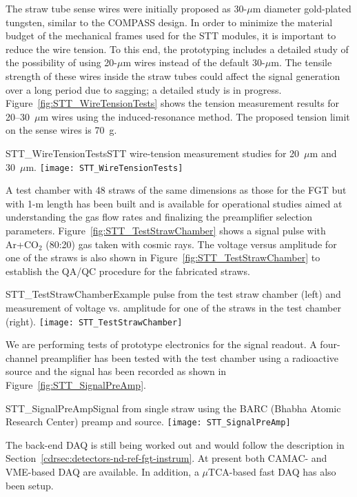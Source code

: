 The straw tube sense wires were initially proposed as 30-$\mu$m
diameter gold-plated tungsten, similar to the COMPASS design. In order
to minimize the material budget of the mechanical frames used for the
STT modules, it is important to reduce the wire tension. To this end,
the prototyping includes a detailed study of the possibility of using
20-$\mu$m wires instead of the default 30-$\mu$m. The tensile strength
of these wires inside the straw tubes could affect the signal
generation over a long period due to sagging; a detailed study is in
progress.  Figure~\ref{fig:STT_WireTensionTests} shows the tension
measurement results for 20--30~$\mu$m wires using the
induced-resonance method.  The proposed tension limit on the sense
wires is 70~g.
\begin{cdrfigure}
{STT_WireTensionTests}{STT wire-tension measurement studies for 20~$\mu$m and 30~$\mu$m.}
\texttt{[image: STT\_WireTensionTests]}
\end{cdrfigure}


A test chamber with 48 straws of the same dimensions as those for the
FGT but with 1-m length has been built and is available for
operational studies aimed at understanding the gas flow rates and
finalizing the preamplifier selection parameters.
Figure~\ref{fig:STT_TestStrawChamber} shows a signal pulse with
Ar+CO$_2$ (80:20) gas taken with cosmic rays. The voltage versus
amplitude for one of the straws is also shown in
Figure~\ref{fig:STT_TestStrawChamber} to establish the QA/QC procedure
for the fabricated straws.
\begin{cdrfigure}
{STT_TestStrawChamber}{Example pulse from the test straw chamber (left) and
measurement of voltage vs. amplitude for one of the straws in the test chamber (right).}
\texttt{[image: STT\_TestStrawChamber]}
\end{cdrfigure}


We are performing tests of prototype electronics for the signal
readout.  A four-channel preamplifier has been tested with the test
chamber using a radioactive source and the signal has been recorded as
shown in Figure~\ref{fig:STT_SignalPreAmp}.
\begin{cdrfigure}
{STT_SignalPreAmp}{Signal from single straw using the BARC (Bhabha Atomic Research Center) preamp and source.}
\texttt{[image: STT\_SignalPreAmp]}
\end{cdrfigure}
The back-end DAQ is still being worked out and would follow the
description in Section~\ref{cdrsec:detectors-nd-ref-fgt-instrum}. At
present both CAMAC- and VME-based DAQ are available. In addition, a
$\mu$TCA-based fast DAQ has also been setup.

